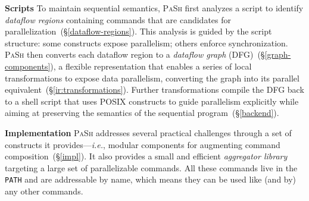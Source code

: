 \documentclass[sigplan, review, screen, anonymous]{acmart}
\newcommand{\ie}{{\em i.e.}, }
\newcommand{\heading}[1]{\vspace{4pt}\noindent\textbf{#1}\enspace}
\newcommand{\ttt}[1]{\texttt{#1}}
\newcommand{\kk}[1]{[{\color{magenta}kk: #1}]}
\newcommand{\sx}[1]{(\S\ref{#1})}
\newcommand{\sys}{{\scshape PaSh}\xspace}
\begin{document}
\heading{Scripts}
To maintain sequential semantics, \sys first analyzes a script to identify \emph{dataflow regions} containing commands that are candidates for parallelization~\sx{dataflow-regions}.
This analysis is guided by the script structure: %
  some constructs expose parallelism; others enforce synchronization.
\sys then converts each dataflow region to a \emph{dataflow graph} (DFG)~\sx{graph-components}, 
  a flexible representation that enables a series of local transformations to expose data parallelism, converting the graph into its parallel equivalent~\sx{ir:transformations}.
Further transformations compile the DFG back to a shell script that uses POSIX constructs to guide parallelism explicitly while aiming at preserving the semantics of the sequential program~\sx{backend}.

\heading{Implementation}
\sys addresses several practical challenges through a set of constructs it provides---\ie 
modular components for augmenting command composition~\sx{impl}.
It also provides a small and efficient \emph{aggregator library} targeting a large set of parallelizable commands.
All these commands live in the \ttt{PATH} and are addressable by name, which means they can be used like (and by) any other commands.
\end{document}
